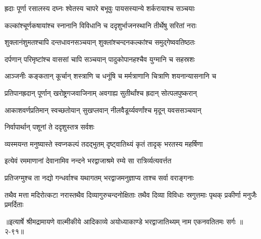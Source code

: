\twolineshloka
{ह्रदाः पूर्णा रसालस्य दघ्नः श्वेतस्य चापरे}
{बभूवुः पायसस्यान्ये शर्करायाश्च सञ्चयाः} %

\twolineshloka
{कल्कांश्चूर्णकषायांश्च स्नानानि विविधानि च}
{ददृशुर्भाजनस्थानि तीर्थेषु सरितां नराः} %

\twolineshloka
{शुक्लानंशुमतश्चापि दन्तधावनसञ्चयान्}
{शुक्लांश्चन्दनकल्कांश्च समुद्गेष्ववतिष्ठतः} %

\twolineshloka
{दर्पणान् परिमृष्टांश्च वाससां चापि सञ्चयान्}
{पादुकोपानहश्चैव युग्मानि च सहस्रशः} %

\twolineshloka
{आञ्जनीः कङ्कतान् कूर्चान् शस्त्राणि च धनूंषि च}
{मर्मत्राणानि चित्राणि शयनान्यासनानि च} %

\twolineshloka
{प्रतिपानह्रदान् पूर्णान् खरोष्ट्रगजवाजिनाम्}
{अवगाह्य सुतीर्थांश्च ह्रदान् सोत्पलपुष्करान्} %

\twolineshloka
{आकाशवर्णप्रतिमान् स्वच्छतोयान् सुखप्लवान्}
{नीलवैडूर्य्यवर्णांश्च मृदून् यवससञ्चयान्} %

\onelineshloka
{निर्वापार्थान् पशूनां ते ददृशुस्तत्र सर्वशः} %

\twolineshloka
{व्यस्मयन्त मनुष्यास्ते स्वप्नकल्पं तदद्भुतम्}
{दृष्ट्वातिथ्यं कृतं तादृक् भरतस्य महर्षिणा} %

\twolineshloka
{इत्येवं रममाणानां देवानामिव नन्दने}
{भरद्वाजाश्रमे रम्ये सा रात्रिर्व्यत्यवर्त्तत} %

\twolineshloka
{प्रतिजग्मुश्च ता नद्यो गन्धर्वाश्च यथागतम्}
{भरद्वाजमनुज्ञाप्य ताश्च सर्वा वराङ्गनाः} %

\twolineshloka
{तथैव मत्ता मदिरोत्कटा नरास्तथैव दिव्यागुरुचन्दनोक्षिताः}
{तथैव दिव्या विविधाः स्रगुत्तमाः पृथक् प्रकीर्णा मनुजैः प्रमर्दिताः} %


॥इत्यार्षे श्रीमद्रामायणे वाल्मीकीये आदिकाव्ये अयोध्याकाण्डे भरद्वाजातिथ्यम् नाम एकनवतितमः सर्गः ॥२-९१॥

